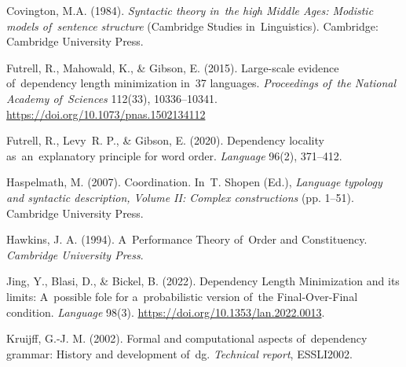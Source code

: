 \documentclass[licencjacka]{pracamgr_Kogni}
\begin{document}
\begin{thebibliography}{99}

Covington, M.A. (1984). \textit{Syntactic theory in~the high Middle Ages: Modistic models of~sentence structure}
(Cambridge Studies in~Linguistics). Cambridge: Cambridge University Press. %

Futrell, R., Mahowald, K., \& Gibson, E. (2015). Large-scale evidence of~dependency length minimization in~37 languages. \textit{Proceedings of~the National Academy of~Sciences} 112(33), 10336–10341. \url{https://doi.org/10.1073/pnas.1502134112}

Futrell, R., Levy~R. P., \& Gibson, E. (2020). Dependency locality as~an~explanatory principle for word order. \textit{Language} 96(2), 371–412. %

Haspelmath, M. (2007). Coordination. In~T. Shopen (Ed.), \textit{Language typology and syntactic description, Volume II: Complex constructions} (pp. 1–51). Cambridge University Press.

Hawkins, J. A. (1994). A~Performance Theory of~Order and Constituency. \textit{Cambridge University Press}. %

Jing, Y., Blasi, D., \& Bickel, B. (2022). Dependency Length Minimization and its limits: A~possible fole for a~probabilistic version of~the Final-Over-Final condition. \textit{Language} 98(3). \url{https://doi.org/10.1353/lan.2022.0013}.

Kruijff, G.-J. M. (2002). Formal and computational aspects of~dependency grammar: History and development of~dg. \textit{Technical report}, ESSLI2002. %


\end{thebibliography}
\end{document}
